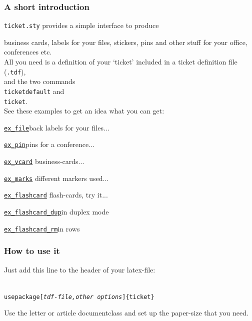 \documentclass[aspectratio=1610,hyperref={pdfpagelabels=false}]{beamer}
\def\code#1{\texttt{#1}}
\newcommand{\ticket}{{\code{ticket.sty}}}
\newcommand{\bs}{{\mtt\\}}
\begin{document}
\begin{frame}
\frametitle{A short introduction}

\begin{block}{\ticket{}}
  provides a simple interface to produce 
\end{block}
  business cards, labels for your files, stickers, pins and
  other stuff for your office, conferences etc.\\[2ex]
  All you need is a definition of your \lq{}ticket\rq{} included in
  a ticket definition file (\code{.tdf}),\\
  and the two commands \code{\bs{}ticketdefault} and \code{\bs{}ticket}.\\
  See these examples to get an idea what you can get:\\
  \begin{exampleblock}{\href{ex_file.pdf}{\code{ex\_file}}}back labels for your files...\end{exampleblock}
  \begin{exampleblock}{\href{ex_pin.pdf}{\code{ex\_pin}}}pins for a conference...\end{exampleblock}
  \begin{exampleblock}{\href{ex_vcard.pdf}{\code{ex\_vcard}}} business-cards...\end{exampleblock}
  \begin{exampleblock}{\href{ex_marks.pdf}{\code{ex\_marks}}} different markers used...\end{exampleblock}
  \begin{exampleblock}{\href{ex_flashcard.pdf}{\code{ex\_flashcard}}} flash-cards, try it...\end{exampleblock}
  \begin{exampleblock}{\href{ex_flashcard_dup.pdf}{\code{ex\_flashcard\_dup}}}in duplex mode\end{exampleblock}
  \begin{exampleblock}{\href{ex_flashcard_rm.pdf}{\code{ex\_flashcard\_rm}}}in rows\end{exampleblock}
\end{frame}
\begin{frame}
  \frametitle{How to use it}

  Just add this line to the header of your latex-file:

  \code{\bs{}usepackage[{\itshape tdf-file,other options}]\{ticket\}}

  Use the letter or article documentclass and 
  set up the paper-size that you need.
\end{frame}
\end{document}
